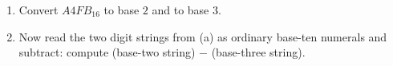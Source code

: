 \begin{enumerate}
\item[(a)] Convert $A4FB_{16}$ to base $2$ and to base $3$.
\item[(b)] Now read the two digit strings from (a) as ordinary base-ten numerals and subtract: compute (base-two string) $-$ (base-three string).
\end{enumerate}
